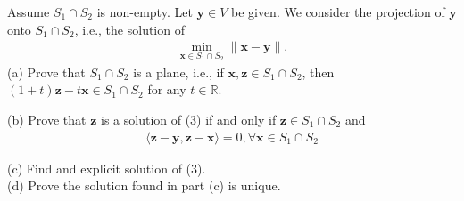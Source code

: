 \documentclass[a4paper,12pt]{article}
\newcommand{\R}{\mathbb{R}}
\begin{document}
Assume \(S_1 \cap S_2\) is non-empty. Let \(\bm{y} \in V\) be given. We consider the projection of \(\bm{y}\) onto \(S_1 \cap S_2\), i.e.,
the solution of 
\begin{align}
    \min_{\bm{x} \in S_1 \cap S_2}\|\bm{x} - \bm{y}\|.
\end{align}
(a) Prove that \(S_1 \cap S_2\) is a plane, i.e., if \(\bm{x}, \bm{z} \in S_1 \cap S_2\), then \((1 + t)\bm{z} - t\bm{x} \in S_1 \cap S_2\) for any \(t \in \R\). 

(b) Prove that \(\bm{z}\) is a solution of (3) if and only if \(\bm{z} \in S_1 \cap S_2\) and 
\begin{align}
    \langle \bm{z} - \bm{y}, \bm{z} - \bm{x}\rangle = 0, \forall \bm{x} \in S_1 \cap S_2
\end{align}

(c) Find and explicit solution of (3). \\

(d) Prove the solution found in part (c) is unique. \\

\begin{align*}
    
\end{align*}
\end{document}
